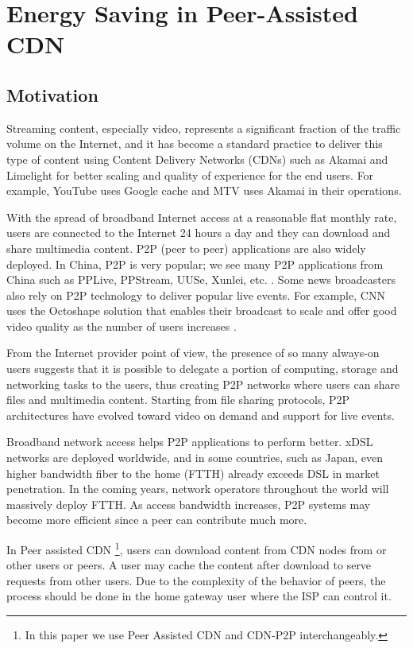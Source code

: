 \chapter{Energy Saving in Peer-Assisted CDN}

\section{Motivation}
Streaming content, especially video, represents a significant fraction of the traffic volume on the Internet, and it has become a standard practice to deliver this type of content using Content Delivery Networks (CDNs) such as Akamai and Limelight for better scaling and quality of experience for the end users.  
For example, YouTube uses Google cache and MTV uses Akamai in their operations.

With the spread of broadband Internet access at a reasonable flat monthly rate, users are connected to the Internet 24 hours a day and they can download and share multimedia content.  
P2P (peer to peer) applications are also widely deployed.  In China, P2P is very popular; we see many P2P applications from China such as PPLive, PPStream, UUSe, Xunlei, etc. \cite{Vu:2010:UOC:1865106.1865115}.  
Some news broadcasters also rely on P2P technology to deliver popular live events.  
For example, CNN uses the Octoshape solution that enables their broadcast to scale and offer good video quality as the number of users increases \cite{octoshape}.

From the Internet provider point of view, the presence of so many always-on users suggests that it is possible to delegate a portion of computing, storage and networking tasks to the users, thus creating P2P networks where users can share files and multimedia content. 
Starting from file sharing protocols, P2P architectures have evolved toward video on demand and support for live events.

Broadband network access helps P2P applications to perform better. 
xDSL networks are deployed worldwide, and in some countries, such as Japan, even higher bandwidth fiber to the home (FTTH) already exceeds DSL in market penetration. 
In the coming years, network operators throughout the world will massively deploy FTTH.  
As access bandwidth increases, P2P systems may become more efficient since a peer can contribute much more.

In Peer assisted CDN \footnote{In this paper we use Peer Assisted CDN and CDN-P2P interchangeably.}, users can download content from CDN nodes from or other users or peers. 
A user may cache the content after download to serve requests from other users. 
Due to the complexity of the behavior of peers, the process should be done in the home gateway user where the ISP can control it.

